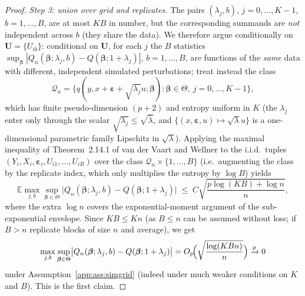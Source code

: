 \documentclass[11pt]{article}
\theoremstyle{plain}
\theoremstyle{definition}
\newcommand{\E}{\mathbb{E}}
\newcommand{\bet}{\bm{\beta}}
\newcommand{\beps}{\bm{\varepsilon}}
\begin{document}
\begin{proof}
\emph{Step 3: union over grid and replicates.} The pairs
$(\lambda_j,b)$, $j=0,\dots,K-1$, $b=1,\dots,B$, are at most $KB$ in
number, but the corresponding summands are \emph{not} independent across
$b$ (they share the data). We therefore argue conditionally on
$\bm U=\{U_{ib}\}$: conditional on $\bm U$, for each $j$ the $B$
statistics $\sup_{\bet}|Q_n(\bet;\lambda_j,b)-Q(\bet;1+\lambda_j)|$,
$b=1,\dots,B$, are functions of the \emph{same} data with different,
independent simulated perturbations; treat instead the class
\[
  \mathcal Q_n=\bigl\{q(y,x+\beps+\sqrt{\lambda_j}u;\bet):
  \bet\in\Theta,\ j=0,\dots,K-1\bigr\},
\]
which has finite pseudo-dimension $(p+2)$ and entropy uniform in $K$
(the $\lambda_j$ enter only through the scalar $\sqrt{\lambda_j}\le
\sqrt{\bar\lambda}$, and $\{(x,\beps,u)\mapsto
\sqrt{\lambda}u\}$ is a one-dimensional parametric family Lipschitz in
$\sqrt\lambda$). Applying the maximal inequality of Theorem~2.14.1 of van
der Vaart and Wellner to the i.i.d.\ tuples
$(Y_i,X_i,\beps_i,U_{i1},\dots,U_{iB})$ over the class
$\mathcal Q_n\times\{1,\dots,B\}$ (i.e.\ augmenting the class by the
replicate index, which only multiplies the entropy by $\log B$) yields
\[
  \E\max_{j,b}\sup_{\bet\in\Theta}\bigl|Q_n(\bet;\lambda_j,b)
  -Q(\bet;1+\lambda_j)\bigr|
  \;\le\; C\sqrt{\frac{p\log(KB)+\log n}{n}},
\]
where the extra $\log n$ covers the exponential-moment argument of the
sub-exponential envelope. Since $KB\le K n$ (as $B\le n$ can be assumed
without loss; if $B>n$ replicate blocks of size $n$ and average), we get
\[
  \max_{j,b}\sup_{\bet\in\Theta}\bigl|Q_n(\bet;\lambda_j,b)
  -Q(\bet;1+\lambda_j)\bigr|
  =O_p\!\Bigl(\sqrt{\frac{\log(KB n)}{n}}\Bigr)\xrightarrow{p}0
\]
under Assumption~\ref{app:ass:simgrid} (indeed under much weaker conditions
on $K$ and $B$). This is the first claim.


\end{proof}
\end{document}
